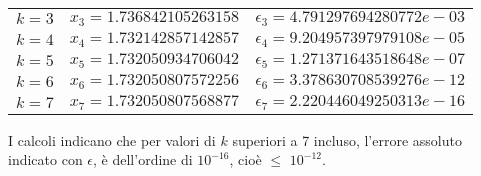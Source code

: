 \begin{enumerate}
\begin{center}
\begin{tabular}{|c|c|c|}
    			$k=3$ & $x_3 = 1.736842105263158$ & $\epsilon_3 = 4.791297694280772e-03$\\
    			$k=4$ & $x_4 = 1.732142857142857$ & $\epsilon_4 = 9.204957397979108e-05$\\
    			$k=5$ & $x_5 = 1.732050934706042$ & $\epsilon_5 = 1.271371643518648e-07$\\
    			$k=6$ & $x_6 = 1.732050807572256$ & $\epsilon_6 = 3.378630708539276e-12$\\
    			$k=7$ & $x_7 = 1.732050807568877$ & $\epsilon_7 = 2.220446049250313e-16$\\
			\hline
			\end{tabular}
		\end{center}
		I calcoli indicano che per valori di $k$ superiori a 7 incluso, l'errore assoluto indicato con $\epsilon$, è dell'ordine di \(10^{-16}\), cioè $\leq$ \(10^{-12}\).\\
\end{enumerate}